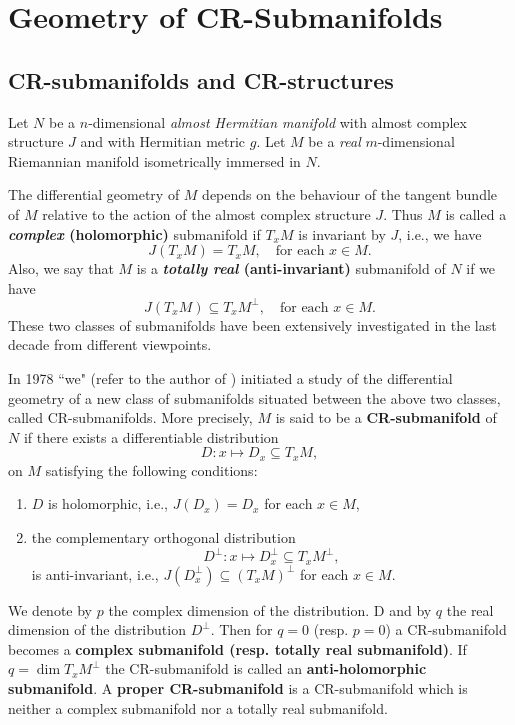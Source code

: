 \chapter{Geometry of CR-Submanifolds}

\section{CR-submanifolds and CR-structures}
Let $N$ be a $n$-dimensional \textit{almost Hermitian manifold} with almost complex structure $J$ and with Hermitian metric $g$. Let $M$ be a \textit{real} $m$-dimensional Riemannian manifold isometrically immersed in $N$.

\begin{definition}
    The differential geometry of $M$ depends on the behaviour of the tangent bundle of $M$ relative to the action of the almost complex structure $J$. Thus $M$ is called a \textbf{\textit{complex} (holomorphic)} submanifold if $T_xM$ is invariant by $J$, i.e., we have
$$
J(T_xM) = T_xM, \quad \text{for each } x \in M.
$$
Also, we say that $M$ is a \textbf{\textit{totally real} (anti-invariant)} submanifold of $N$ if we have
$$
J(T_xM) \subseteq T_xM^{\perp}, \quad \text{for each } x \in M.
$$
These two classes of submanifolds have been extensively investigated in the last decade from different viewpoints.
\end{definition}

\begin{definition}
    In 1978 ``we" (refer to the author of \cite{bejancuGeometryCRSubmanifolds1986}) initiated a study of the differential geometry of a new class of submanifolds situated between the above two classes, called CR-submanifolds. More precisely, $M$ is said to be a \textbf{CR-submanifold} of $N$ if there exists a differentiable distribution
\[
D: x \mapsto D_x \subseteq T_xM,
\]
on $M$ satisfying the following conditions:
\begin{enumerate}
    \item[(i)] $D$ is holomorphic, i.e., $J(D_x) = D_x$ for each $x \in M$,
    \item[(ii)] the complementary orthogonal distribution
    \[
    D^{\perp}: x \mapsto D^{\perp}_x \subseteq T_xM^{\perp},
    \]
    is anti-invariant, i.e., $J(D^{\perp}_x) \subseteq (T_xM)^{\perp}$ for each $x \in M$.
\end{enumerate}
We denote by $p$ the complex dimension of the distribution.
D and by $q$ the real dimension of the distribution $D^\perp$. Then for $q = 0$ (resp. $p = 0$) a CR-submanifold becomes a \textbf{complex submanifold (resp. totally real submanifold)}. If $q = \dim T_xM^\perp$ the CR-submanifold is called an \textbf{anti-holomorphic submanifold}. A \textbf{proper CR-submanifold} is a CR-submanifold which is neither a complex submanifold nor a totally real submanifold.
\end{definition}

